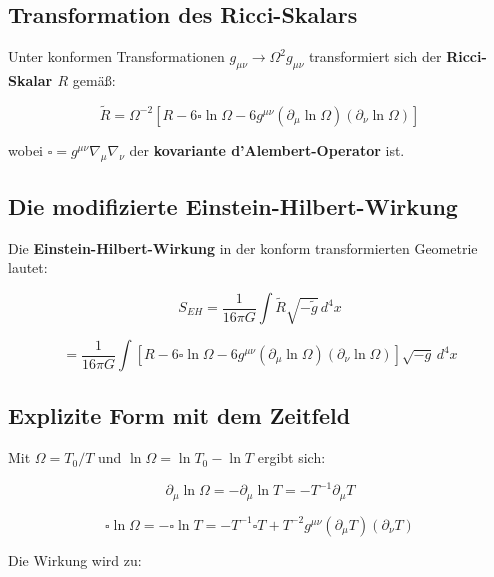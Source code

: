 \documentclass[12pt,a4paper]{report}
\begin{document}
	\subsection{Transformation des Ricci-Skalars}
	
	Unter konformen Transformationen $g_{\mu\nu} \to \Omega^2 g_{\mu\nu}$ transformiert sich der \textbf{Ricci-Skalar $R$} gemäß:
	
	\begin{equation}
		\tilde{R} = \Omega^{-2}[R - 6\square\ln \Omega - 6g^{\mu\nu}(\partial_\mu \ln \Omega)(\partial_\nu \ln \Omega)]
	\end{equation}
	
	wobei $\square = g^{\mu\nu}\nabla_\mu\nabla_\nu$ der \textbf{kovariante d'Alembert-Operator} ist.
	
	\subsection{Die modifizierte Einstein-Hilbert-Wirkung}
	
	Die \textbf{Einstein-Hilbert-Wirkung} in der konform transformierten Geometrie lautet:
	
	\begin{equation}
		S_{EH} = \frac{1}{16\pi G} \int \tilde{R} \sqrt{-\tilde{g}} \, d^4x
	\end{equation}
	
	\begin{equation}
		= \frac{1}{16\pi G} \int [R - 6\square\ln \Omega - 6g^{\mu\nu}(\partial_\mu \ln \Omega)(\partial_\nu \ln \Omega)] \sqrt{-g} \, d^4x
	\end{equation}
	
	\subsection{Explizite Form mit dem Zeitfeld}
	
	Mit $\Omega = T_0/T$ und $\ln \Omega = \ln T_0 - \ln T$ ergibt sich:
	
	\begin{equation}
		\partial_\mu \ln \Omega = -\partial_\mu \ln T = -T^{-1}\partial_\mu T
	\end{equation}
	
	\begin{equation}
		\square\ln \Omega = -\square\ln T = -T^{-1}\square T + T^{-2}g^{\mu\nu}(\partial_\mu T)(\partial_\nu T)
	\end{equation}
	
	Die Wirkung wird zu:
	
\end{document}
